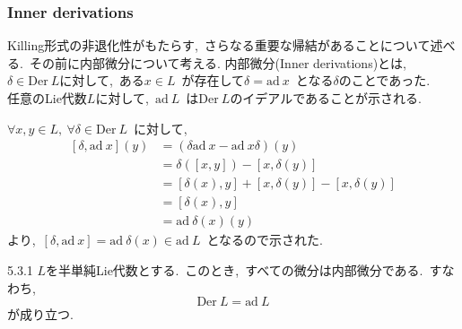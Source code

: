 \documentclass[uplatex,dvipdfmx]{jsarticle}
\begin{document}
\subsubsection{Inner derivations}
Killing形式の非退化性がもたらす,~さらなる重要な帰結があることについて述べる.~その前に内部微分について考える.
内部微分(Inner derivations)とは,~$\delta \in \text{Der}~L$に対して,~ある$x\in L$~が存在して$\delta =\text{ad}~x$~となる$\delta$のことであった.\\
任意のLie代数$L$に対して,~$\text{ad}~L$~は$\text{Der}~L$のイデアルであることが示される.
\begin{myproof}
    $\forall x,y\in L,~\forall \delta \in \text{Der}~L$~に対して,
    \begin{equation*}
        \begin{split}
            [\delta, \text{ad}~x](y)&=(\delta \text{ad}~x - \text{ad}~x \delta)(y)\\
            &=\delta([x,y]) - [x, \delta(y)]\\
            &=[\delta(x),y]+[x,\delta(y)] - [x, \delta(y)]\\
            &=[\delta(x),y]\\
            &=\text{ad}~\delta(x)(y)
        \end{split}
    \end{equation*}
    より,~$[\delta, \text{ad}~x]=\text{ad}~\delta(x)\in \text{ad}~L$~となるので示された.
\end{myproof}
\begin{mythm}{5.3.1}
    $L$を半単純Lie代数とする.~このとき,~すべての微分は内部微分である.~すなわち,
    \begin{equation*}
        \text{Der}~L = \text{ad}~L
    \end{equation*}
    が成り立つ.
\end{mythm}
\end{document}
